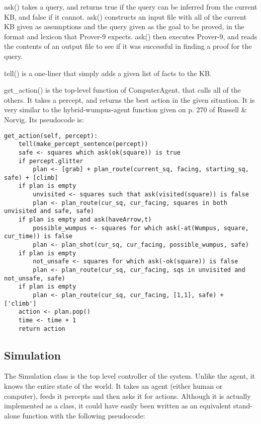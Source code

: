 \documentclass[10 pt.]{article}
\begin{document}
ask() takes a query, and returns true if the query can be inferred from the
current KB, and false if it cannot. ask() constructs an input file with all of
the current KB given as assumptions and the query given as the goal to be
proved, in the format and lexicon that Prover-9 expects. ask() then executes
Prover-9, and reads the contents of an output file to see if it was
successful in finding a proof for the query.

tell() is a one-liner that simply adds a given list of facts to the KB.

get\_action() is the top-level function of ComputerAgent, that calls all of the
others. It takes a percept, and returns the best action in the given situation.
It is very similar to the hybrid-wumpus-agent function given on p. 270 of
Russell \& Norvig. Its pseudocode is:

\begin{verbatim}
get_action(self, percept):
    tell(make_percept_sentence(percept))
    safe <- squares which ask(ok(square)) is true
    if percept.glitter
        plan <- [grab] + plan_route(current_sq, facing, starting_sq, safe) + [climb]
    if plan is empty
        unvisited <- squares such that ask(visited(square)) is false
        plan <- plan_route(cur_sq, cur_facing, squares in both unvisited and safe, safe)
    if plan is empty and ask(haveArrow,t)
        possible_wumpus <- squares for which ask(-at(Wumpus, square, cur_time)) is false
        plan <- plan_shot(cur_sq, cur_facing, possible_wumpus, safe)
    if plan is empty
        not_unsafe <- squares for which ask(-ok(square)) is false
        plan <- plan_route(cur_sq, cur_facing, sqs in unvisited and not_unsafe, safe)
    if plan is empty
        plan <- plan_route(cur_sq, cur_facing, [1,1], safe) + ['climb']
    action <- plan.pop()
    time <- time + 1
    return action
\end{verbatim}

\subsection{Simulation}
The Simulation class is the top level controller of the system. Unlike the
agent, it knows the entire state of the world. It takes an agent (either human
or computer), feeds it percepts and
then asks it for actions. Although it is actually implemented as a class, it
could have easily been written as an equivalent stand-alone function with the
following pseudocode:
\end{document}
